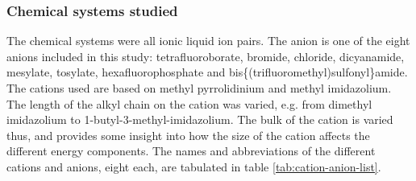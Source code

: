 

\subsubsection{Chemical systems studied}
The chemical systems were all ionic liquid ion pairs. 
The anion is one of the eight anions included in this study: tetrafluoroborate, bromide, chloride, dicyanamide, mesylate, tosylate, hexafluorophosphate and bis\{(trifluoromethyl)sulfonyl\}amide. 
The cations used are based on methyl pyrrolidinium and methyl imidazolium. 
The length of the alkyl chain on the cation was varied, e.g. from dimethyl imidazolium to 1-butyl-3-methyl-imidazolium.
The bulk of the cation is varied thus, and provides some insight into how the size of the cation affects the different energy components.
The names and abbreviations of the different cations and anions, eight each, are tabulated in 
table \ref{tab:cation-anion-list}.


